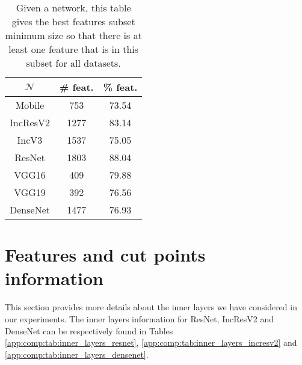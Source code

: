 \begin{table}
\centering
\begin{tabular}{|c|cc|}
\hline
$\mathcal{N}$ & \textbf{\# feat.} & \textbf{\% feat.} \\
\hline
Mobile & 753 & 73.54 \\
IncResV2 & 1277 & 83.14 \\
IncV3 & 1537 & 75.05 \\
ResNet & 1803 & 88.04 \\
VGG16 & 409 & 79.88 \\
VGG19 & 392 & 76.56 \\
DenseNet & 1477 & 76.93 \\
\hline
\end{tabular}
\caption{Given a network, this table gives the best features subset minimum size so that there is at least one feature that is in this subset for all datasets.}
\label{app:comp:tab:best_subset_size}
\end{table}

\section{Features and cut points information}
\label{app:comp:sec:features_and_cut_points}

This section provides more details about the inner layers we have considered in our experiments. The inner layers information for ResNet, IncResV2 and DenseNet can be respectively found in Tables \ref{app:comp:tab:inner_layers_resnet}, \ref{app:comp:tab:inner_layers_incresv2} and \ref{app:comp:tab:inner_layers_densenet}. 

